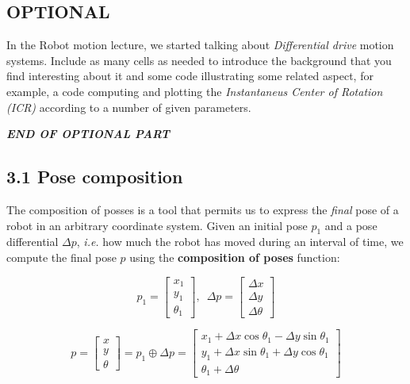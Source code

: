 \documentclass[11pt]{article}
\begin{document}
    \hypertarget{optional}{%
\subsection{\texorpdfstring{{OPTIONAL}}{OPTIONAL}}\label{optional}}

{In the Robot motion lecture, we started talking about
\emph{Differential drive} motion systems. Include as many cells as
needed to introduce the background that you find interesting about it
and some code illustrating some related aspect, for example, a code
computing and plotting the \emph{Instantaneus Center of Rotation (ICR)}
according to a number of given parameters.}

    {\textbf{\emph{END OF OPTIONAL PART}}}

    \hypertarget{pose-composition}{%
\subsection{\texorpdfstring{3.1 Pose composition
}{3.1 Pose composition }}\label{pose-composition}}

The composition of posses is a tool that permits us to express the
\emph{final} pose of a robot in an arbitrary coordinate system. Given an
initial pose \(p_1\) and a pose differential \(\Delta p\), \emph{i.e.}
how much the robot has moved during an interval of time, we compute the
final pose \(p\) using the \textbf{composition of poses} function:

\[
    p_1 = 
        \begin{bmatrix}
            x_1 \\ y_1 \\ \theta_1
        \end{bmatrix}, \, \, \,
    \Delta p = 
        \begin{bmatrix}
            \Delta x \\ \Delta y \\ \Delta \theta
        \end{bmatrix}
\]

\[
    \begin{equation}
    p = \begin{bmatrix}
            x \\ y \\ \theta
        \end{bmatrix}
        = p_1 \oplus \Delta p
        = \begin{bmatrix}
            x_1 + \Delta x \cos \theta_1 - \Delta y \sin \theta_1 \\ 
            y_1 + \Delta x \sin \theta_1 + \Delta y \cos \theta_1 \\
            \theta_1 + \Delta \theta
          \end{bmatrix}
    \end{equation}
\]
\end{document}
